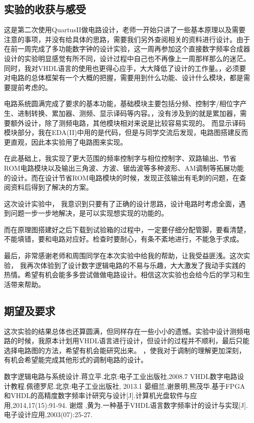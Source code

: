 \documentclass[12pt]{article}
\begin{document}
\subsection{实验的收获与感受}
这是第二次使用QuartusII做电路设计，老师一开始只讲了一些基本原理以及需要注意的事项，并没有给具体的思路，需要我们另外查阅相关的资料进行设计。由于在前一周完成了多功能数字钟的设计实验，这一周再参加这个直接数字频率合成器设计的实验明显感觉有所不同，设计过程中自己也不再像上一周那样那么的迷茫。同时，我对VHDL语言的使用也更得心应手，大大降低了设计的工作量。，必须要对电路的总体框架有一个大概的把握，需要用到什么功能、设计什么模块，都是需要提前考虑的。\par
电路系统圆满完成了要求的基本功能，基础模块主要包括分频、控制字/相位字产生、进制转换、累加器、测频、显示译码等内容。，没有涉及到的就是累加器，需要额外设计，除了测频电路，其他模块相对来说是比较容易实现的。
而显示译码模块部分，我在EDA(II)中用的是代码，但是与同学交流后发现，电路图搭建反而更直观，因此本实验用了电路图来实现。\par
在此基础上，我实现了更大范围的频率控制字与相位控制字、双路输出、节省ROM电路模块以及输出三角波、方波、锯齿波等多种波形、AM调制等拓展功能的设计。而在设计节省ROM电路模块的时候，发现正弦输出有毛刺的问题，在查阅资料后得到了解决的方案。\par
这次设计实验中，
我意识到只要有了正确的设计思路，设计电路时考虑全面，遇到问题一步一步地解决，是可以实现想实现的功能的。\par
而在原理图搭建好之后下载到试验箱的过程中，一定要仔细分配管脚，要看清楚，不能填错，要和电路对应好。检查时要耐心，有条不紊地进行，不能急于求成。\par
最后，非常感谢老师和周围同学在本次实验中给我的帮助，让我受益匪浅。这次实验， 我再次体验到了设计数字逻辑电路的不易与乐趣，大大激发了我动手实践的热情。希望有机会能多多尝试做做电路设计。相信这次实验也会给今后的学习和生活带来帮助。
\subsection{期望及要求}
这次实验的结果总体也还算圆满，但同样存在一些小小的遗憾。实验中设计测频电路的时候，我原本计划用VHDL语言进行设计，但设计的过程并不顺利，最后只能选择电路图的方法，希望有机会能研究出来。
，使我对于调制的理解更加深刻，有机会希望能完成其他形式的调制电路的设计。
\begin{thebibliography}{15}\addtolength{\itemsep}{-0.5ex}
数字逻辑电路与系统设计.蒋立平.北京:电子工业出版社,2008.7 
\bibitem{} VHDL数字电路设计教程.佩德罗尼.北京:电子工业出版社, 2013.1
\bibitem{} 晏细兰,谢景明,熊茂华.基于FPGA和VHDL的高精度数字频率计研究与设计[J].计算机光盘软件与应用,2014,17(15):91-94.
\bibitem{} 谢煜 ,黄为.一种基于VHDL语言数字频率计的设计与实现[J].电子设计应用,2003(07):25-27.
\end{thebibliography}
\end{document}
